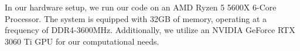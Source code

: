 \begin{ZhChapter}
    In our hardware setup, we run our code on an AMD Ryzen 5 5600X 6-Core Processor. The system is equipped with 32GB of memory, operating at a frequency of DDR4-3600MHz. Additionally, we utilize an NVIDIA GeForce RTX 3060 Ti GPU for our computational needs.





\end{ZhChapter}